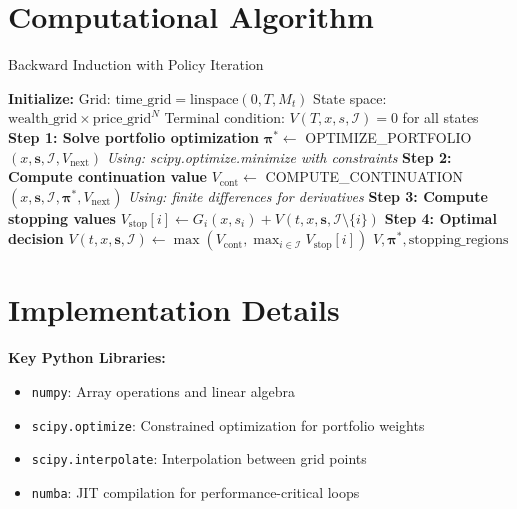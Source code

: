 \documentclass[11pt]{article}
\begin{document}
\section{Computational Algorithm}

\begin{algorithm}[H] %
\caption{Backward Induction with Policy Iteration}
\begin{algorithmic}[1]
\STATE \textbf{Initialize:}
\STATE \quad Grid: $\text{time\_grid} = \text{linspace}(0, T, M_t)$
\STATE \quad State space: $\text{wealth\_grid} \times \text{price\_grid}^N$
\STATE \quad Terminal condition: $V(T, x, s, \mathcal{I}) = 0$ for all states
\STATE
{}
            \STATE
            \STATE \textbf{Step 1: Solve portfolio optimization}
            \STATE $\boldsymbol{\pi}^* \leftarrow$ OPTIMIZE\_PORTFOLIO$(x, \mathbf{s}, \mathcal{I}, V_{\text{next}})$
            \STATE \quad \textit{Using: scipy.optimize.minimize with constraints}
            \STATE
            \STATE \textbf{Step 2: Compute continuation value}
            \STATE $V_{\text{cont}} \leftarrow$ COMPUTE\_CONTINUATION$(x, \mathbf{s}, \mathcal{I}, \boldsymbol{\pi}^*, V_{\text{next}})$
            \STATE \quad \textit{Using: finite differences for derivatives}
            \STATE
            \STATE \textbf{Step 3: Compute stopping values}
                \STATE $V_{\text{stop}}[i] \leftarrow G_i(x, s_i) + V(t, x, \mathbf{s}, \mathcal{I}\setminus\{i\})$
            \ENDFOR
            \STATE
            \STATE \textbf{Step 4: Optimal decision}
            \STATE $V(t, x, \mathbf{s}, \mathcal{I}) \leftarrow \max(V_{\text{cont}}, \max_{i\in\mathcal{I}} V_{\text{stop}}[i])$
        \ENDFOR
    \ENDFOR
\ENDFOR
\RETURN $V, \boldsymbol{\pi}^*, \text{stopping\_regions}$
\end{algorithmic}
\end{algorithm}

\vspace{0.5cm} %

\section{Implementation Details}

\textbf{Key Python Libraries:}
\begin{itemize}
\item \texttt{numpy}: Array operations and linear algebra
\item \texttt{scipy.optimize}: Constrained optimization for portfolio weights
\item \texttt{scipy.interpolate}: Interpolation between grid points
\item \texttt{numba}: JIT compilation for performance-critical loops
\end{itemize}
\end{document}
